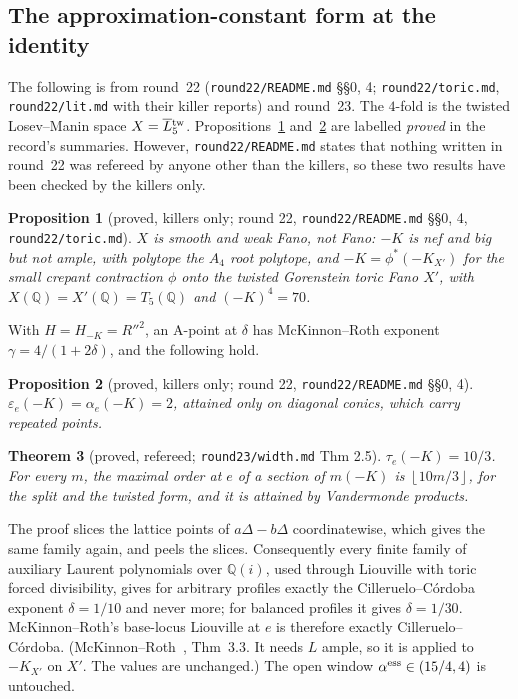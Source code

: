 \documentclass[11pt]{article}
\newtheorem{theorem}{Theorem}[section]
\newtheorem{proposition}[theorem]{Proposition}
\newcommand{\Q}{\mathbb Q}
\newcommand{\floor}[1]{\left\lfloor #1 \right\rfloor}
\newcommand{\Ltw}[1]{\overline L{}^{\rm tw}_{#1}}
\newcommand{\rec}[1]{\texttt{#1}}
\begin{document}
\subsection{The approximation-constant form at the identity}

The following is from round~22 (\rec{round22/README.md} \S\S0, 4;
\rec{round22/toric.md}, \rec{round22/lit.md} with their killer reports) and
round~23.  The \(4\)-fold is the twisted Losev--Manin space \(X=\Ltw5\).
Propositions~\ref{prop:weakFano} and~\ref{prop:seshadri} are labelled
\emph{proved} in the record's summaries.  However, \rec{round22/README.md}
states that nothing written in round~22 was refereed by anyone other than the
killers, so these two results have been checked by the killers only.

\begin{proposition}[proved, killers only; round 22, \rec{round22/README.md} \S\S0, 4, \rec{round22/toric.md}]\label{prop:weakFano}
\(X\) is smooth and \emph{weak Fano}, not Fano: \(-K\) is nef and big but not
ample, with polytope the \(A_4\) root polytope, and \(-K=\phi^*(-K_{X'})\) for
the small crepant contraction \(\phi\) onto the twisted Gorenstein toric Fano
\(X'\), with \(X(\Q)=X'(\Q)=T_5(\Q)\) and \((-K)^4=70\).
\end{proposition}

With \(H=H_{-K}=R''^2\), an A-point at \(\delta\) has McKinnon--Roth exponent
\(\gamma=4/(1+2\delta)\), and the following hold.

\begin{proposition}[proved, killers only; round 22, \rec{round22/README.md} \S\S0, 4]\label{prop:seshadri}
\(\varepsilon_e(-K)=\alpha_e(-K)=2\), attained only on diagonal conics, which
carry repeated points.
\end{proposition}

\begin{theorem}[proved, refereed; \rec{round23/width.md} Thm 2.5]\label{thm:tau}
\(\tau_e(-K)=10/3\).  For every \(m\), the maximal order at \(e\) of a section
of \(m(-K)\) is \(\floor{10m/3}\), for the split and the twisted form, and it is
attained by Vandermonde products.
\end{theorem}

The proof slices the lattice points of \(a\Delta-b\Delta\) coordinatewise,
which gives the same family again, and peels the slices.  Consequently every
finite family of auxiliary Laurent polynomials over \(\Q(i)\), used through
Liouville with toric forced divisibility, gives for arbitrary profiles exactly
the Cilleruelo--C\'ordoba exponent \(\delta=1/10\) and never more; for
balanced profiles it gives \(\delta=1/30\).  McKinnon--Roth's base-locus
Liouville at \(e\) is therefore exactly Cilleruelo--C\'ordoba.
(McKinnon--Roth~\cite{McKinnonRoth2016}, Thm~3.3.  It needs \(L\) ample, so it
is applied to \(-K_{X'}\) on \(X'\).  The values are unchanged.)  The open window
\(\alpha^{\rm ess}\in(15/4,4)\) is untouched.
\end{document}
